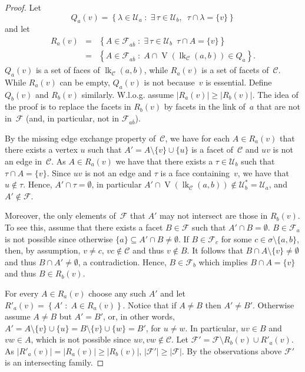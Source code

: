 \documentclass[a4paper,12pt]{amsart}
\theoremstyle{plain}
\theoremstyle{definition}
\newcommand{\U}{\mathcal U}
\newcommand{\C}{\mathcal C}
\newcommand{\family}{\mathcal F}
\newcommand{\facetA}{A}
\newcommand{\facetB}{B}
\newcommand{\face}{\sigma}
\newcommand{\smallface}{\tau}
\DeclareMathOperator{\vertices}{V}
\newcommand{\set}[2]{\left\{ #1 \; : \; #2 \right\}}
\newcommand{\lkcap}[3]{\operatorname{lk}_{#1} (#2,#3)}
\begin{document}
\begin{proof}
Let
\[
Q_a(v) = \set{\lambda \in \U_a }{ \exists \, \smallface \in \U_b, \enspace \smallface \cap \lambda = \{v\} }
\]
and let
\begin{eqnarray*}
R_a(v)&=&
\set{\facetA \in \family_{a\overline b}}{ \exists \, \smallface \in \U_b \enspace \smallface\cap \facetA = \{v\}} \\
&=&
\set{\facetA \in \family_{a\overline b}}{ \facetA\cap \vertices(\lkcap{\C}{a}{b}) \in Q_a}.
\end{eqnarray*}
$Q_a(v)$ is a set of faces of $\lkcap{\C}{a}{b}$, while $R_a(v)$ is a set of facets of~$\C$.
While $R_a(v)$ can be empty, $Q_a(v)$ is not because~$v$ is essential.
Define $Q_b(v)$ and $R_b(v)$ similarly. W.l.o.g. assume $|R_a(v)| \geq |R_b(v)|$. The idea of the proof is to replace the facets in $R_b(v)$ by facets
in the link of~$a$ that are not in~$\family$ (and, in particular, not in $\family_{a\overline b}$).

By the missing edge exchange property of~$\C$, we have for each $\facetA \in R_a(v)$ that there exists a vertex $u$ such that $\facetA' = \facetA\setminus \{v\} \cup \{u\}$ is a facet of~$\C$ and $uv$ is not an edge in~$\C$. As $\facetA \in R_a(v)$ we have that there exists a $\smallface \in \U_b$ such that $\smallface\cap \facetA = \{v\}$. Since $uv$ is not an edge and $\smallface$ is a face containing~$v$, we have that $u\not\in \smallface$. Hence,  $\facetA' \cap \smallface = \emptyset$, in particular $\facetA'\cap \vertices(\lkcap{\C}{a}{b}) \notin \U_b^*=\U_a$, and $\facetA' \notin \family$.

Moreover, the only elements of~$\family$ that $\facetA'$ may not intersect are those in $R_b(v)$. To see this, assume that there exists a facet $\facetB \in \family$ such that $\facetA' \cap \facetB = \emptyset$. $\facetB \in \family_a$ is not possible since otherwise $\{a \} \subseteq \facetA' \cap \facetB \neq \emptyset$. If $\facetB \in \family_c$ for some $c \in \face \setminus \{a,b\}$, then, by assumption, $v\neq c$, $vc \not \in \C$ and thus $v \not \in \facetB$. It follows that $\facetB \cap \facetA \setminus \{v\} \neq \emptyset$ and thus $\facetB \cap \facetA' \neq \emptyset$, a contradiction. Hence, $\facetB \in \family_b$ which implies $\facetB \cap \facetA = \{ v\}$ and thus $\facetB \in R_b(v)$.

For every $\facetA\in R_a(v)$ choose any such $\facetA'$ and let $R'_a(v) = \set{\facetA' }{ \facetA \in R_a(v)}$. Notice that if $\facetA \neq \facetB$ then $\facetA' \neq \facetB'$. Otherwise assume $\facetA\neq \facetB$ but $\facetA'=\facetB'$, or, in other words, $\facetA' = \facetA\setminus \{v\} \cup \{u\} = \facetB \setminus \{v\} \cup \{w\} = \facetB'$, for $u \neq w$. In particular, $uv \in \facetB$ and $vw \in \facetA$, which is not possible since $uv, vw \not \in \C$.
Let $\family' = \family \setminus R_b(v) \cup R'_a(v)$. As $|R'_a(v)| = |R_a(v)|\ge|R_b(v)|$, $|\family'| \geq |\family|$. By the observations above $\family'$ is an intersecting family.


\end{proof}
\end{document}
